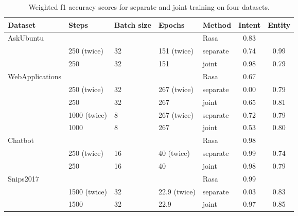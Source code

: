 \begin{table}[htbp]
    \centering
    \begin{tabular}{l l l l l c c}
        \textbf{Dataset}    & \textbf{Steps}  & \textbf{Batch size} & \textbf{Epochs}  & \textbf{Method}   & \textbf{Intent}  & \textbf{Entity}\\
        \hline
        AskUbuntu           & & & & Rasa & 0.83 \\
                            & 250 (twice) & 32 & 151 (twice) &  separate & 0.74 & 0.99\\
                            & 250 & 32 & 151 & joint & 0.98 & 0.79\\
        \hline
        WebApplications     & & & & Rasa & 0.67\\
                            & 250 (twice) & 32 & 267 (twice) & separate & 0.00 & 0.79\\
                            & 250 & 32 & 267 & joint & 0.65 & 0.81\\
                            & 1000 (twice) & 8 & 267 (twice) & separate & 0.72 & 0.79\\
                            & 1000 & 8 & 267 & joint & 0.53 & 0.80\\
        \hline
        Chatbot             & & & & Rasa & 0.98 \\
                            & 250 (twice) & 16 & 40 (twice) & separate & 0.99 & 0.74\\
                            & 250 & 16 & 40 & joint & 0.98 & 0.79\\
        \hline
        Snips2017           & & & & Rasa & 0.99\\
                            & 1500 (twice) & 32 & 22.9 (twice) & separate & 0.03 & 0.83\\
                            & 1500 & 32 & 22.9 & joint & 0.97 & 0.85\\
        \hline
    \end{tabular}
    \caption{Weighted f1 accuracy scores for separate and joint training on four datasets.}
    \label{tab:runs_scores}
\end{table}

